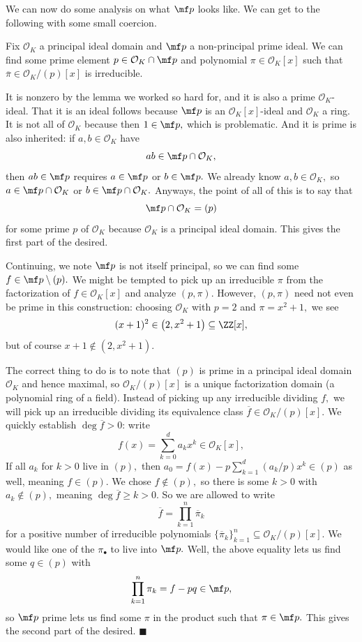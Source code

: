We can now do some analysis on what $\mf p$ looks like. We can get to the following with some small coercion.
\begin{lemma}
    Fix $\mathcal O_K$ a principal ideal domain and $\mf p$ a non-principal prime ideal. We can find some prime element $p\in\mathcal O_K\cap\mf p$ and polynomial $\pi\in\mathcal O_K[x]$ such that $\overline\pi\in\mathcal O_K/(p)[x]$ is irreducible.
\end{lemma}
It is nonzero by the lemma we worked so hard for, and it is also a prime $\mathcal O_K$-ideal. That it is an ideal follows because $\mf p$ is an $\mathcal O_K[x]$-ideal and $\mathcal O_K$ a ring. It is not all of $\mathcal O_K$ because then $1\in\mf p,$ which is problematic. And it is prime is also inherited: if $a,b\in\mathcal O_K$ have
\[ab\in\mf p\cap\mathcal O_K,\]
then $ab\in\mf p$ requires $a\in\mf p$ or $b\in\mf p.$ We already know $a,b\in\mathcal O_K,$ so $a\in\mf p\cap\mathcal O_K$ or $b\in\mf p\cap\mathcal O_K.$ Anyways, the point of all of this is to say that
\[\mf p\cap\mathcal O_K=(p)\]
for some prime $p$ of $\mathcal O_K$ because $\mathcal O_K$ is a principal ideal domain. This gives the first part of the desired.

Continuing, we note $\mf p$ is not itself principal, so we can find some $f\in\mf p\setminus(p).$ We might be tempted to pick up an irreducible $\pi$ from the factorization of $f\in\mathcal O_K[x]$ and analyze $(p,\pi).$ However, $(p,\pi)$ need not even be prime in this construction: choosing $\mathcal O_K$ with $p=2$ and $\pi=x^2+1,$ we see
\[(x+1)^2\in\left(2,x^2+1\right)\subseteq\ZZ[x],\]
but of course $x+1\not\in\left(2,x^2+1\right).$

The correct thing to do is to note that $(p)$ is prime in a principal ideal domain $\mathcal O_K$ and hence maximal, so $\mathcal O_K/(p)[x]$ is a unique factorization domain (a polynomial ring of a field). Instead of picking up any irreducible dividing $f,$ we will pick up an irreducible dividing its equivalence class $\overline f\in\mathcal O_K/(p)[x].$ We quickly establish $\deg\overline f>0$: write
\[f(x)=\sum_{k=0}^da_kx^k\in\mathcal O_K[x],\]
If all $a_k$ for $k>0$ live in $(p),$ then $a_0=f(x)-p\sum_{k=1}^d(a_k/p)x^k\in(p)$ as well, meaning $f\in(p).$ We chose $f\not\in(p),$ so there is some $k>0$ with $a_k\not\in(p),$ meaning $\deg\overline f\ge k>0.$ So we are allowed to write
\[\overline f=\prod_{k=1}^n\overline\pi_k\]
for a positive number of irreducible polynomials $\{\overline\pi_k\}_{k=1}^n\subseteq\mathcal O_K/(p)[x].$ We would like one of the $\pi_\bullet$ to live into $\mf p.$ Well, the above equality lets us find some $q\in(p)$ with
\[\prod_{k=1}^n\pi_k=f-pq\in\mf p,\]
so $\mf p$ prime lets us find some $\pi$ in the product such that $\pi\in\mf p.$ This gives the second part of the desired. $\blacksquare$

